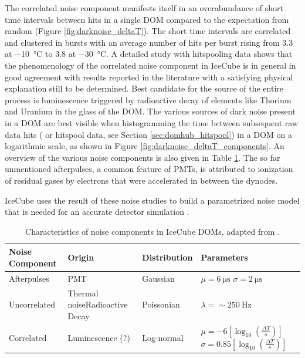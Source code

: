 The correlated noise component manifests itself in an overabundance of short time intervals between hits in a single DOM compared to the expectation from random (Figure \ref{fig:darknoise_deltaT}). The short time intervals are correlated and clustered in bursts with an average number of hits per burst rising from \num{3.3} at \SI{-10}{\celsius} to \num{3.8} at \SI{-30}{\celsius}. A detailed study with hitspooling data shows that the phenomenology of the correlated noise component in IceCube is in general in good agreement with results reported in the literature with a satisfying physical explanation still to be determined. Best candidate for the source of the entire process is luminescence triggered by radioactive decay of elements like Thorium and Uranium in the glass of the DOM.
The various sources of dark noise present in a DOM are best visible when histogramming the time between subsequent raw data hits ( or hitspool data, see Section \ref{sec:domhub_hitspool}) in a DOM on a logarithmic scale, as shown in Figure \ref{fig:darknoise_deltaT_components}. An overview of the various noise components is also given in Table \ref{tab:noise}. The so far unmentioned afterpulses, a common feature of PMTs, is attributed to ionization
of residual gases by electrons that were accelerated in between the dynodes. 

IceCube uses the result of these noise studies to build a parametrized noise model that is needed for an accurate detector simulation \cite{larson2013simulation}.

\begin{table}[h!]
\caption{Characteristics of noise components in IceCube DOMs, adapted from \cite{stanisha_noise_14}.}
  \centering
  \footnotesize
\begin{tabularx}{\textwidth}{lXXX}
\toprule
Noise Component& Origin & Distribution & Parameters \\
\midrule
Afterpulses & PMT & Gaussian & $\mu = \SI{6}{\micro\second}$ \newline $\sigma = \SI{2}{\micro\second}$\\
Uncorrelated & Thermal noise\newline Radioactive Decay & Poissonian & $\lambda = \sim \SI{250}{\hertz}$\\
Correlated & Luminescence (?) & Log-normal & $\mu = \num{-6} [\log_{10}(\frac{\Delta T}{s})]$ \newline $\sigma = \num{0.85} [\log_{10}(\frac{\Delta T}{s})]$\\
\bottomrule
\end{tabularx}
\label{tab:noise}
\end{table}

